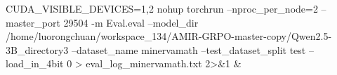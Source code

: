 CUDA_VISIBLE_DEVICES=1,2 nohup torchrun --nproc_per_node=2 --master_port 29504     -m Eval.eval     --model_dir /home/luorongchuan/workspace_134/AMIR-GRPO-master-copy/Qwen2.5-3B_directory3     --dataset_name minervamath     --test_dataset_split test     --load_in_4bit 0 > eval_log_minervamath.txt 2>&1 &